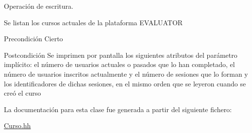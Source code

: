 Operación de escritura. 

Se listan los cursos actuales de la plataforma E\+V\+A\+L\+U\+A\+T\+OR \begin{DoxyPrecond}{Precondición}
Cierto 
\end{DoxyPrecond}
\begin{DoxyPostcond}{Postcondición}
Se imprimen por pantalla los siguientes atributos del parámetro implícito\+: el número de usuarios actuales o pasados que lo han completado, el número de usuarios inscritos actualmente y el número de sesiones que lo forman y los identificadores de dichas sesiones, en el mismo orden que se leyeron cuando se creó el curso 
\end{DoxyPostcond}


La documentación para esta clase fue generada a partir del siguiente fichero\+:\begin{DoxyCompactItemize}
\item 
\mbox{\hyperlink{_curso_8hh}{Curso.\+hh}}\end{DoxyCompactItemize}
